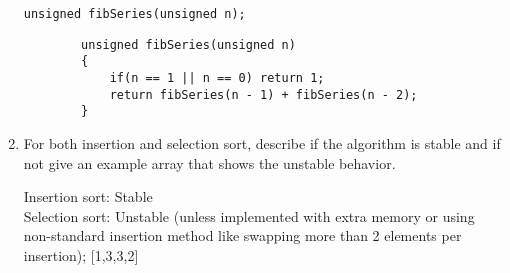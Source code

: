 \documentclass[11pt]{article}
\begin{document}
\begin{enumerate}
        \verb|unsigned fibSeries(unsigned n);|
    
    \begin{verbatim}
        unsigned fibSeries(unsigned n)
        {
            if(n == 1 || n == 0) return 1;
            return fibSeries(n - 1) + fibSeries(n - 2);
        }
    \end{verbatim}
    
    \item For both insertion and selection sort, describe if the algorithm is stable and if not give an example array that shows the unstable behavior.
    
    Insertion sort: Stable\\
    Selection sort: Unstable (unless implemented with extra memory or using non-standard insertion method like swapping more than 2 elements per insertion); [1,3,3,2]
    \end{enumerate}
    
    \label{r:lastpage}
    
    
\end{document}
